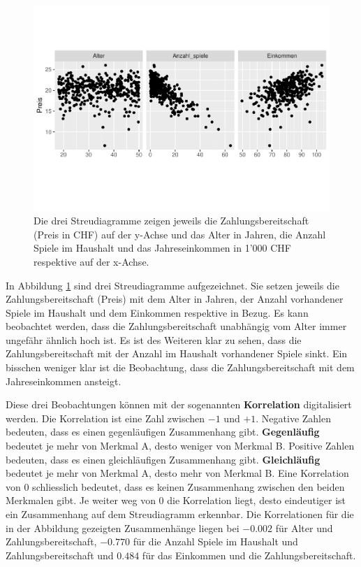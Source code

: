 \documentclass[
]{book}
\theoremstyle{definition}
\theoremstyle{definition}
\theoremstyle{definition}
\theoremstyle{definition}
\theoremstyle{remark}
\begin{document}
\begin{figure}
\centering
\includegraphics{aps_statistik1_files/figure-latex/exm-zahlungsbereitschaft-streudiagramm-1.pdf}
\caption{\label{fig:exm-zahlungsbereitschaft-streudiagramm}Die drei Streudiagramme zeigen jeweils die Zahlungsbereitschaft (Preis in CHF) auf der y-Achse und das Alter in Jahren, die Anzahl Spiele im Haushalt und das Jahreseinkommen in 1'000 CHF respektive auf der x-Achse.}
\end{figure}

In Abbildung \ref{fig:exm-zahlungsbereitschaft-streudiagramm} sind drei Streudiagramme aufgezeichnet. Sie setzen jeweils die Zahlungsbereitschaft (Preis) mit dem Alter in Jahren, der Anzahl vorhandener Spiele im Haushalt und dem Einkommen respektive in Bezug. Es kann beobachtet werden, dass die Zahlungsbereitschaft unabhängig vom Alter immer ungefähr ähnlich hoch ist. Es ist des Weiteren klar zu sehen, dass die Zahlungsbereitschaft mit der Anzahl im Haushalt vorhandener Spiele sinkt. Ein bisschen weniger klar ist die Beobachtung, dass die Zahlungsbereitschaft mit dem Jahreseinkommen ansteigt.

\label{customdef-korrelation}{Diese drei Beobachtungen können mit der sogenannten \textbf{Korrelation} digitalisiert werden.} Die Korrelation ist eine Zahl zwischen \(-1\) und \(+1\). Negative Zahlen bedeuten, dass es einen gegenläufigen Zusammenhang gibt. \label{customdef-gegenlaeufig}{\textbf{Gegenläufig} bedeutet je mehr von Merkmal A, desto weniger von Merkmal B.} Positive Zahlen bedeuten, dass es einen gleichläufigen Zusammenhang gibt. \label{customdef-gleichlaeufig}{\textbf{Gleichläufig} bedeutet je mehr von Merkmal A, desto mehr von Merkmal B.} Eine Korrelation von \(0\) schliesslich bedeutet, dass es keinen Zusammenhang zwischen den beiden Merkmalen gibt. Je weiter weg von \(0\) die Korrelation liegt, desto eindeutiger ist ein Zusammenhang auf dem Streudiagramm erkennbar. Die Korrelationen für die in der Abbildung gezeigten Zusammenhänge liegen bei \(-0.002\) für Alter und Zahlungsbereitschaft, \(-0.770\) für die Anzahl Spiele im Haushalt und Zahlungsbereitschaft und \(0.484\) für das Einkommen und die Zahlungsbereitschaft.
\end{document}
